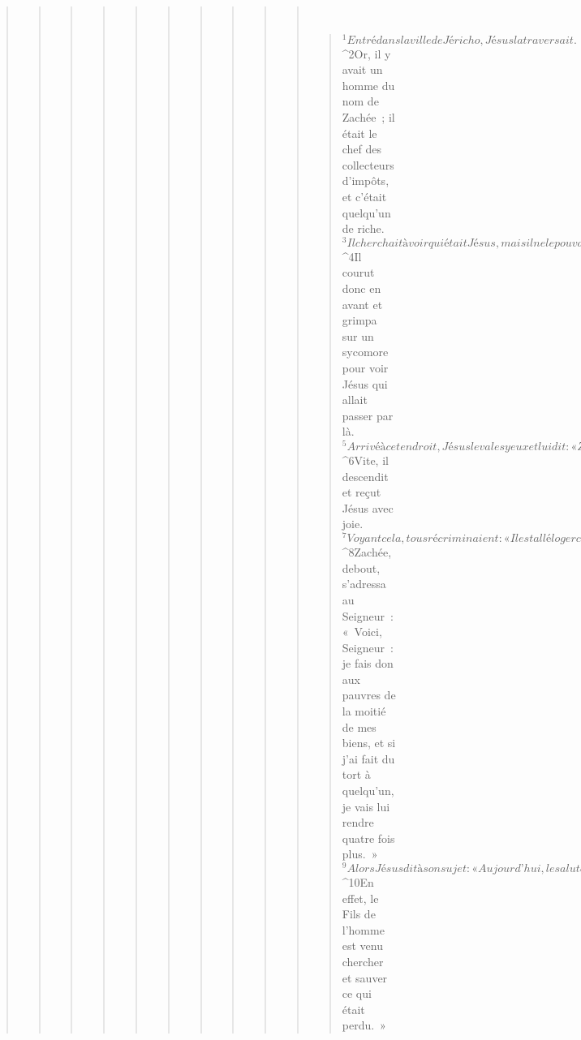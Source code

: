 \begin{verse}
\begin{verse}
\begin{verse}
\begin{verse}
\begin{verse}
\begin{verse}
\begin{verse}
\begin{verse}
\begin{verse}
\begin{verse}
         
      \bchapter{}
      \begin{verse}
${}^{1}Entré dans la ville de Jéricho, Jésus la traversait. 
${}^{2}Or, il y avait un homme du nom de Zachée ; il était le chef des collecteurs d’impôts, et c’était quelqu’un de riche. 
${}^{3}Il cherchait à voir qui était Jésus, mais il ne le pouvait pas à cause de la foule, car il était de petite taille. 
${}^{4}Il courut donc en avant et grimpa sur un sycomore pour voir Jésus qui allait passer par là. 
${}^{5}Arrivé à cet endroit, Jésus leva les yeux et lui dit : « Zachée, descends vite : aujourd’hui il faut que j’aille demeurer dans ta maison. » 
${}^{6}Vite, il descendit et reçut Jésus avec joie. 
${}^{7}Voyant cela, tous récriminaient : « Il est allé loger chez un homme qui est un pécheur. » 
${}^{8}Zachée, debout, s’adressa au Seigneur : « Voici, Seigneur : je fais don aux pauvres de la moitié de mes biens, et si j’ai fait du tort à quelqu’un, je vais lui rendre quatre fois plus. » 
${}^{9}Alors Jésus dit à son sujet : « Aujourd’hui, le salut est arrivé pour cette maison, car lui aussi est un fils d’Abraham. 
${}^{10}En effet, le Fils de l’homme est venu chercher et sauver ce qui était perdu. »
      

\end{verse}
\end{verse}
\end{verse}
\end{verse}
\end{verse}
\end{verse}
\end{verse}
\end{verse}
\end{verse}
\end{verse}
\end{verse}

